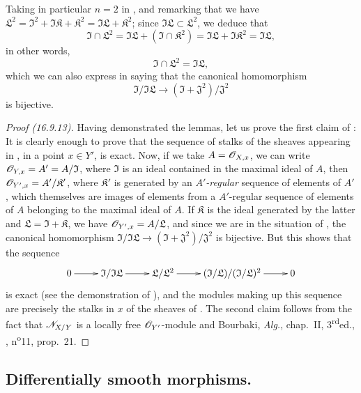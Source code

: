 Taking in particular $n = 2$ in , and remarking that we have $\mathfrak{L}^2 = \mathfrak{I}^2 + \mathfrak{I}\mathfrak{K} + \mathfrak{K}^2 = \mathfrak{I}\mathfrak{L} + \mathfrak{K}^2$;
since $\mathfrak{I}\mathfrak{L} \subset \mathfrak{L}^2$, we deduce that
\[
  \mathfrak{I} \cap \mathfrak{L}^2 = \mathfrak{I}\mathfrak{L} + (\mathfrak{I} \cap \mathfrak{K}^2) = \mathfrak{I}\mathfrak{L} + \mathfrak{I}\mathfrak{K}^2 = \mathfrak{I}\mathfrak{L},
\]
in other words, 
\[
  \label{IV.16.9.13.7}
  \mathfrak{I} \cap \mathfrak{L}^2 = \mathfrak{I}\mathfrak{L},
  \tag{16.9.13.7}
\]
which we can also express in saying that the canonical homomorphism
\[
  \mathfrak{I}/\mathfrak{I}\mathfrak{L} \to (\mathfrak{I} + \mathfrak{J}^2)/\mathfrak{J}^2
\]
is bijective.

\begin{proof}[Proof (16.9.13)]
Having demonstrated the lemmas, let us prove the first claim of :
It is clearly
enough to prove that the sequence of stalks of the sheaves appearing in , in a point $x \in Y'$, is exact.
Now, if we take $A = \mathscr{O}_{X,x}$, we can write $\mathscr{O}_{Y, x} = A' = A/\mathfrak{I}$, where $\mathfrak{I}$ is an ideal contained in the maximal ideal of $A$, then $\mathscr{O}_{Y', x} = A'/\mathfrak{K}'$, where $\mathfrak{K}'$ is generated by an \emph{$A'$-regular} sequence of elements of $A'$, which themselves are images of elements from a $A'$-regular sequence of elements of $A$ belonging to the maximal ideal of $A$.
If $\mathfrak{K}$ is the ideal generated by the latter and $\mathfrak{L} = \mathfrak{I} + \mathfrak{K}$, we have $\mathscr{O}_{Y', x} = A/\mathfrak{L}$, and since we are in the situation of , the canonical homomorphism $\mathfrak{I}/\mathfrak{I}\mathfrak{L} \to (\mathfrak{I} + \mathfrak{J}^2)/\mathfrak{J}^2$ is bijective.
But this shows that the sequence
\[
  \xymatrix{
    0 \ar[r] & \mathfrak{I}/\mathfrak{I}\mathfrak{L} \ar[r] & \mathfrak{L}/\mathfrak{L}^2 \ar[r] &  (\mathfrak{I}/\mathfrak{L})/(\mathfrak{I}/\mathfrak{L})^2 \ar[r] & 0
  }
\]
is exact (see the demonstration of ), and the modules making up this sequence are precisely the stalks in $x$ of the sheaves of .
The second claim follows from the fact that $\mathscr{N}_{X/Y}$ is a locally free $\mathscr{O}_{Y'}$-module  and Bourbaki, \emph{Alg.}, chap.~II, 3\textsuperscript{rd}ed., , n\textsuperscript{o}11, prop.\ 21.
\end{proof}

\subsection{Differentially smooth morphisms.}
\label{IV.16.10}

